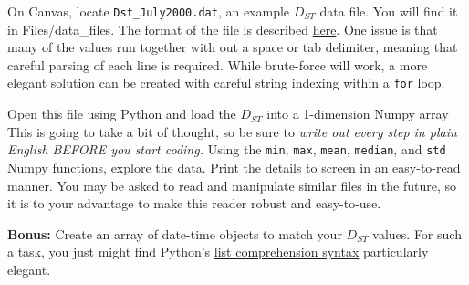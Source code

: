 \documentclass[12pt, letterpaper]{article}
\begin{document}
\begin{enumerate}
  On Canvas, locate {\tt Dst\_July2000.dat}, an example $D_{ST}$ data file.
  You will find it in Files/data\_files.  The format of the file is described 
  \href{http://wdc.kugi.kyoto-u.ac.jp/dstae/format/dstformat.html}{here}.
  One issue is that many of the values run together with out a space or tab
  delimiter, meaning that careful parsing of each line is required.  While
  brute-force will work, a more elegant solution can be created with careful
  string indexing within a {\tt for} loop.

  Open this file using Python and load the $D_{ST}$ into a 1-dimension Numpy
  array This is going to take a bit of thought, so be sure to
  \emph{write out every step in plain English BEFORE you start coding.}
  Using the {\tt min}, {\tt max}, {\tt mean}, {\tt median}, and {\tt std}
  Numpy functions, explore the data.  Print the details to screen in an
  easy-to-read manner.  You may be asked to read and manipulate similar files
  in the future, so it is to your advantage to make this reader robust and
  easy-to-use.

  \textbf{Bonus:} Create an array of date-time objects to match
  your $D_{ST}$  values.  For such a task, you just might find Python's
  \href{https://docs.python.org/3/tutorial/datastructures.html#list-comprehensions}{list comprehension syntax}
  particularly elegant.

\end{enumerate}
\end{document}
